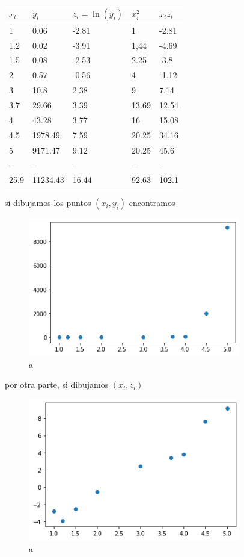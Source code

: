 \documentclass[
]{article}
\begin{document}
\begin{longtable}[]{@{}lllll@{}}
\toprule
\(x_i\) & \(y_i\) & \(z_i = \ln(y_i)\) & \(x_i^2\) &
\(x_i z_i\)\tabularnewline
\midrule
\endhead
1 & 0.06 & -2.81 & 1 & -2.81\tabularnewline
1.2 & 0.02 & -3.91 & 1,44 & -4.69\tabularnewline
1.5 & 0.08 & -2.53 & 2.25 & -3.8\tabularnewline
2 & 0.57 & -0.56 & 4 & -1.12\tabularnewline
3 & 10.8 & 2.38 & 9 & 7.14\tabularnewline
3.7 & 29.66 & 3.39 & 13.69 & 12.54\tabularnewline
4 & 43.28 & 3.77 & 16 & 15.08\tabularnewline
4.5 & 1978.49 & 7.59 & 20.25 & 34.16\tabularnewline
5 & 9171.47 & 9.12 & 20.25 & 45.6\tabularnewline
-- & -- & -- & -- & --\tabularnewline
25.9 & 11234.43 & 16.44 & 92.63 & 102.1\tabularnewline
\bottomrule
\end{longtable}

si dibujamos los puntos \((x_i,y_i)\) encontramos

\begin{figure}
\centering
\includegraphics[width=3.64583in,height=\textheight]{exponential_regression.png}
\caption{a}
\end{figure}

por otra parte, si dibujamos \((x_i,z_i)\)

\begin{figure}
\centering
\includegraphics[width=3.64583in,height=\textheight]{exponential_regression2.png}
\caption{a}
\end{figure}
\end{document}

